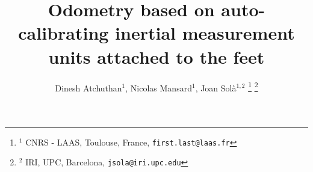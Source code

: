 \documentclass[letterpaper, 10 pt, conference]{ieeeconf}  %
\title{\LARGE \bf
Odometry based on auto-calibrating inertial measurement units attached to the feet
}
\author{Dinesh Atchuthan$^{1}$, Nicolas Mansard$^1$, Joan Sol\`a$^{1,2}$%
\thanks{$^{1}$ CNRS - LAAS, Toulouse, France, \tt {\small first.last@laas.fr}}%
\thanks{$^{2}$ IRI, UPC, Barcelona, \tt{\small jsola@iri.upc.edu}}
}
\begin{document}
\maketitle
\thispagestyle{empty}
\pagestyle{empty}

\begin{abstract}
\end{abstract}









\end{document}
